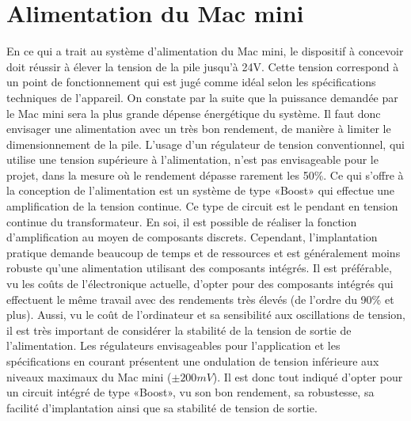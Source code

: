 \section{Alimentation du Mac mini} \label{s:alim_mac_mini}
En ce qui a trait au système d'alimentation du Mac mini, le dispositif à concevoir doit réussir à élever la tension de la pile jusqu'à 24V. Cette tension correspond à un point de fonctionnement qui est jugé comme idéal selon les spécifications techniques de l'appareil. On constate par la suite que la puissance demandée par le Mac mini sera la plus grande dépense énergétique du système. Il faut donc envisager une alimentation avec un très bon rendement, de manière à limiter le dimensionnement de la pile. L'usage d'un régulateur de tension conventionnel, qui utilise une tension supérieure à l'alimentation, n'est pas envisageable pour le projet, dans la mesure où le rendement dépasse rarement les 50\%. Ce qui s'offre à la conception de l'alimentation est un système de type «Boost» qui effectue une amplification de la tension continue. Ce type de circuit est le pendant en tension continue du transformateur. En soi, il est possible de réaliser la fonction d'amplification au moyen de composants discrets. Cependant, l'implantation pratique demande beaucoup de temps et de ressources et est généralement moins robuste qu'une alimentation utilisant des composants intégrés. Il est préférable, vu les coûts de l'électronique actuelle, d'opter pour des composants intégrés qui effectuent le même travail avec des rendements très élevés (de l'ordre du 90\% et plus). Aussi, vu le coût de l'ordinateur et sa sensibilité aux oscillations de tension, il est très important de considérer la stabilité de la tension de sortie de l'alimentation. Les régulateurs envisageables pour l'application et les spécifications en courant présentent une ondulation de tension inférieure aux niveaux maximaux du Mac mini ($\pm 200mV$). Il est donc tout indiqué d'opter pour un circuit intégré de type «Boost», vu son bon rendement, sa robustesse, sa facilité d'implantation ainsi que sa stabilité de tension de sortie.


